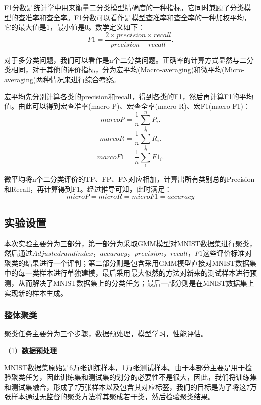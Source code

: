 \documentclass[UTF8]{ctexart}
\begin{document}
F1分数是统计学中用来衡量二分类模型精确度的一种指标，它同时兼顾了分类模型的查准率和查全率。F1分数可以看作是模型查准率和查全率的一种加权平均，它的最大值是1，最小值是0。数学定义如下：
\begin{equation}
	F1 = \frac{2\times{precision}\times{recall}}{precision+recall}.
\end{equation}

对于多分类问题，我们可以看作是n个二分类问题。正确率的计算方式显然与二分类相同，对于其他的评价指标，分为宏平均(Macro-averaging)和微平均(Micro-averaging)两种情况来进行综合考察。

宏平均先分别计算各类的precision和recall，得到各类的F1，然后再计算F1的平均值。由此可以得到宏查准率(macro-P)、宏查全率(macro-R)、宏F1(macro-F1)：
\begin{equation}
	marcoP=\frac{1}{n}\sum_1^nP_i.
\end{equation}
\begin{equation}
	marcoR=\frac{1}{n}\sum_1^nR_i.
\end{equation}
\begin{equation}
	marcoF1=\frac{1}{n}\sum_1^nF1_i.
\end{equation}

微平均将n个二分类评价的TP、FP、FN对应相加，计算出所有类别总的Precision和Recall，再计算得到F1。经过推导可知，此时满足：
\begin{equation}
	microP=microR=microF1=accuracy
\end{equation}

\subsection{实验设置}

本次实验主要分为三部分，第一部分为采取GMM模型对MNIST数据集进行聚类，然后通过$Adjusted rand index$，$accuracy$，$precision$，$recall$，$F1$这些评价标准对聚类的结果进行一个评判；第二部分则是包含采用GMM模型直接对MNIST数据集中的每一类样本进行单独建模，最后采用最大似然的方法对新来的测试样本进行预测，从而解决了MNIST数据集上的分类任务；最后一部分则是在MNIST数据集上实现新的样本生成。

\subsubsection{整体聚类}

聚类任务主要分为三个步骤，数据预处理，模型学习，性能评估。

（1）\textbf{数据预处理}

MNIST数据集原始是6万张训练样本，1万张测试样本。由于本部分主要是用于检验聚类任务，因此训练集和测试集的划分的必要性不是很大，因此，我们将训练集和测试集融合，形成了7万张样本以及包含其对应标签，我们的目标是为了将这7万张样本通过无监督的聚类方法将其聚成若干类，然后检验聚类结果。
\end{document}
